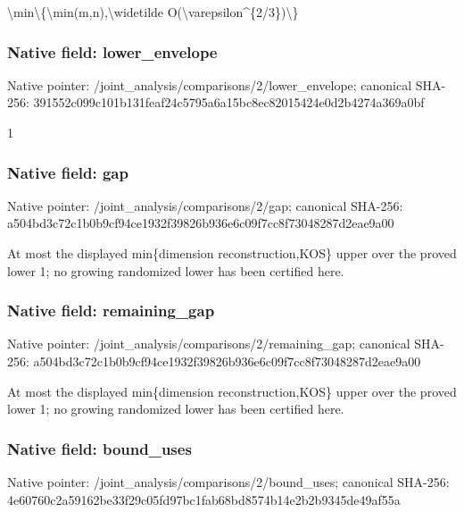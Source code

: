 \documentclass[10pt,a4paper]{article}
\begin{document}
\textbackslash{}min\textbackslash{}\{\textbackslash{}min(m,n),\textbackslash{}widetilde O(\textbackslash{}varepsilon\textasciicircum{}\{2/3\})\textbackslash{}\}


\subsubsection{Native field: lower\_envelope}


Native pointer: /joint\_analysis/comparis\allowbreak{}ons/2/lower\_envelope; canonical SHA-256: 391552c099c101b131feaf24\allowbreak{}c5795a6a15bc8ec82015424e\allowbreak{}0d2b4274a369a0bf


1


\subsubsection{Native field: gap}


Native pointer: /joint\_analysis/comparisons/2/gap; canonical SHA-256: a504bd3c72c1b0b9cf94ce19\allowbreak{}32f39826b936e6c09f7cc8f7\allowbreak{}3048287d2eae9a00


At most the displayed min\{dimension reconstruction,KOS\} upper over the proved lower 1; no growing randomized lower has been certified here.


\subsubsection{Native field: remaining\_gap}


Native pointer: /joint\_analysis/comparis\allowbreak{}ons/2/remaining\_gap; canonical SHA-256: a504bd3c72c1b0b9cf94ce19\allowbreak{}32f39826b936e6c09f7cc8f7\allowbreak{}3048287d2eae9a00


At most the displayed min\{dimension reconstruction,KOS\} upper over the proved lower 1; no growing randomized lower has been certified here.


\subsubsection{Native field: bound\_uses}


Native pointer: /joint\_analysis/comparis\allowbreak{}ons/2/bound\_uses; canonical SHA-256: 4e60760c2a59162be33f29c0\allowbreak{}5fd97bc1fab68bd8574b14e2\allowbreak{}b2b9345de49af55a
\end{document}
